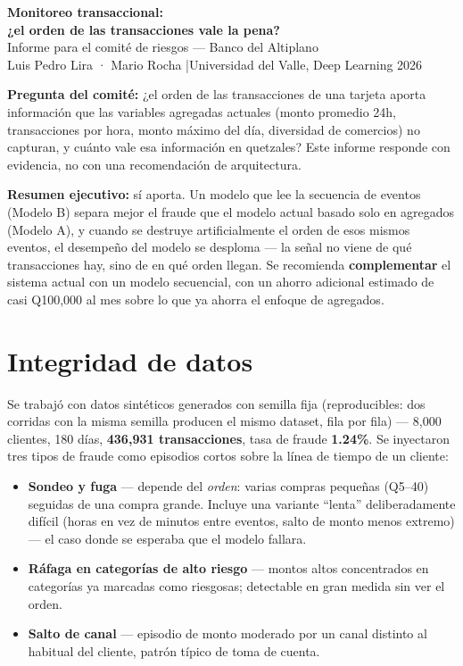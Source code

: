 \documentclass[10.5pt]{article}
\begin{document}
\begin{center}
{\LARGE \bfseries Monitoreo transaccional: \\[2pt] ¿el orden de las transacciones vale la pena?}\\[6pt]
{\large Informe para el comité de riesgos — Banco del Altiplano}\\[2pt]
\small Luis Pedro Lira · Mario Rocha \quad|\quad Universidad del Valle, Deep Learning 2026
\end{center}

\vspace{2pt}
\textbf{Pregunta del comité:} ¿el orden de las transacciones de una tarjeta aporta información que
las variables agregadas actuales (monto promedio 24h, transacciones por hora, monto máximo del día,
diversidad de comercios) no capturan, y cuánto vale esa información en quetzales? Este informe
responde con evidencia, no con una recomendación de arquitectura.

\textbf{Resumen ejecutivo:} sí aporta. Un modelo que lee la secuencia de eventos (Modelo B) separa
mejor el fraude que el modelo actual basado solo en agregados (Modelo A), y cuando se destruye
artificialmente el orden de esos mismos eventos, el desempeño del modelo se desploma — la señal no
viene de qué transacciones hay, sino de en qué orden llegan. Se recomienda \textbf{complementar} el
sistema actual con un modelo secuencial, con un ahorro adicional estimado de casi Q100{,}000 al mes
sobre lo que ya ahorra el enfoque de agregados.

\section{Integridad de datos}

Se trabajó con datos sintéticos generados con semilla fija (reproducibles: dos corridas con la misma
semilla producen el mismo dataset, fila por fila) — 8{,}000 clientes, 180 días, \textbf{436{,}931
transacciones}, tasa de fraude \textbf{1.24\%}. Se inyectaron tres tipos de fraude como episodios
cortos sobre la línea de tiempo de un cliente:

\begin{itemize}
  \item \textbf{Sondeo y fuga} — depende del \emph{orden}: varias compras pequeñas (Q5–40) seguidas
  de una compra grande. Incluye una variante ``lenta'' deliberadamente difícil (horas en vez de
  minutos entre eventos, salto de monto menos extremo) — el caso donde se esperaba que el modelo
  fallara.
  \item \textbf{Ráfaga en categorías de alto riesgo} — montos altos concentrados en categorías ya
  marcadas como riesgosas; detectable en gran medida sin ver el orden.
  \item \textbf{Salto de canal} — episodio de monto moderado por un canal distinto al habitual del
  cliente, patrón típico de toma de cuenta.
\end{itemize}
\end{document}
